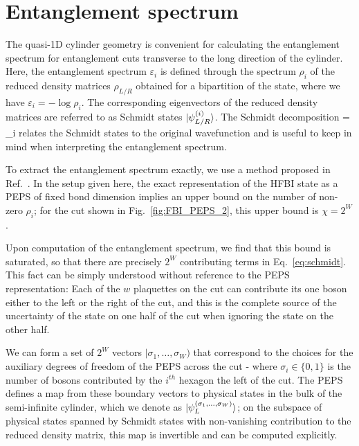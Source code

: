 
\newcommand{\uL}{\mathbf{L_0}}
\newcommand{\bL}{\mathbf{\bar{L}_0}}

\section{Entanglement spectrum}
\label{sec:ES}

The quasi-1D cylinder geometry is convenient for calculating the
entanglement spectrum for entanglement cuts transverse to the long direction of the
cylinder. Here, the entanglement spectrum $\varepsilon_i$ is defined through the spectrum
$\rho_i$ of the reduced density matrices $\rho_{L/R}$ obtained for a bipartition of the state,
where we have $\varepsilon_i = -\log \rho_i$.
The corresponding eigenvectors of the reduced density matrices
are referred to as Schmidt states $\vert \psi^{(i)}_{L/R} \rangle$. 
The Schmidt decomposition 
\beq
\ket{\psi} = \sum\limits_i 
\label{eq:schmidt}
\eeq
relates the Schmidt states to the original wavefunction and is useful to keep in mind
when interpreting the entanglement spectrum.

To extract the entanglement spectrum exactly,
we use a method proposed in Ref.~.
In the setup given here, the exact representation of the HFBI state as a PEPS of
fixed bond dimension implies an upper bound on the number of non-zero $\rho_i$; 
for the cut shown in Fig.~\ref{fig:FBI_PEPS_2}, this upper bound is $\chi=2^W$.

Upon computation of the entanglement spectrum, we find that this bound is saturated,
so that there are precisely $2^W$ contributing terms in Eq.~\ref{eq:schmidt}.
This fact can be simply understood without reference to the PEPS representation:
Each of the $w$ plaquettes on the cut can contribute its one boson either to the left
or the right of the cut, and this is the complete source of the uncertainty
of the state on one half of the cut when ignoring the state on the other half.

We can form a set of $2^W$ vectors $|\sigma_1,\ldots,\sigma_W)$ that correspond to the
choices for the auxiliary degrees of freedom of the PEPS across the cut - where
$\sigma_i \in \{0, 1\}$ is the number of bosons contributed by the $i^{th}$ hexagon
the left of the cut.
The PEPS defines
a map from these boundary vectors to physical states in the bulk of the
semi-infinite cylinder, which we denote as $\vert \psi_L^{(\sigma_1, \ldots, \sigma_W)} \rangle$;
on the subspace of physical states spanned by Schmidt states with non-vanishing contribution
to the reduced density matrix, this map is invertible and can be computed explicitly.

